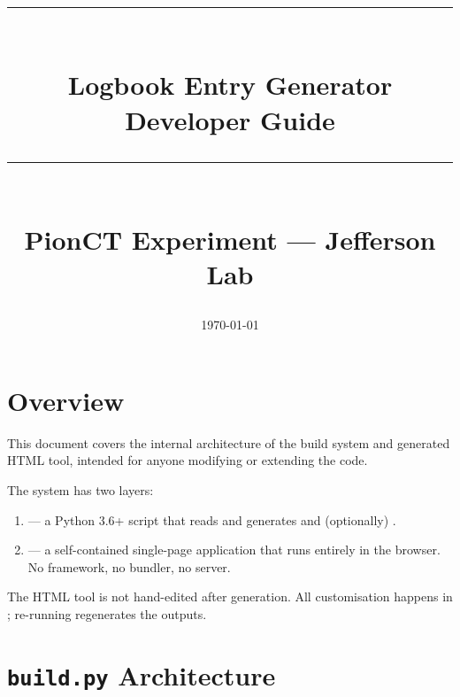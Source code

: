 



\title{
    \vspace{2cm}
    {\color{pionorange}\rule{\linewidth}{2pt}}\\[0.6em]
    {\Huge\bfseries Logbook Entry Generator}\\[0.3em]
    {\Large Developer Guide}\\[0.4em]
    {\color{pionorange}\rule{\linewidth}{2pt}}\\[1em]
    {\large PionCT Experiment --- Jefferson Lab}
    \vspace{1cm}
}
\author{}
\date{\today}
\maketitle
\thispagestyle{empty}

\tableofcontents
\newpage

\chapter{Overview}

This document covers the internal architecture of the build system and
generated HTML tool, intended for anyone modifying or extending the code.

The system has two layers:

\begin{enumerate}
    \item \textbf{} --- a Python 3.6+ script that reads
           and generates
           and (optionally)
          .
    \item \textbf{} --- a self-contained
          single-page application that runs entirely in the browser. No
          framework, no bundler, no server.
\end{enumerate}

The HTML tool is not hand-edited after generation. All customisation happens
in ; re-running  regenerates the outputs.

\chapter{\texttt{build.py} Architecture}

